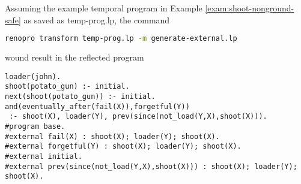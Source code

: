 \begin{example}
  Assuming the example temporal program in Example
  \ref{exam:shoot-nonground-safe} as saved as temp-prog.lp, the
  command
\begin{lstlisting}[language=bash,numbers=none]
renopro transform temp-prog.lp -m generate-external.lp
\end{lstlisting}
wound result in the reflected program

\begin{lstlisting}
loader(john).
shoot(potato_gun) :- initial.
next(shoot(potato_gun)) :- initial.
and(eventually_after(fail(X)),forgetful(Y)) 
 :- shoot(X), loader(Y), prev(since(not_load(Y,X),shoot(X))).
#program base.
#external fail(X) : shoot(X); loader(Y); shoot(X).
#external forgetful(Y) : shoot(X); loader(Y); shoot(X).
#external initial.
#external prev(since(not_load(Y,X),shoot(X))) : shoot(X); loader(Y); shoot(X).
\end{lstlisting}
\end{example}

